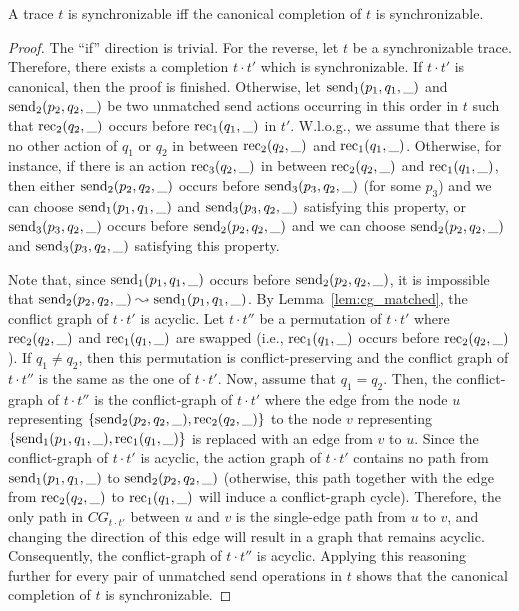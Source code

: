 \begin{lemma}\label{lem:synch_canonical1}
A trace $t$ is synchronizable if{f} the canonical completion of $t$ is synchronizable.
\end{lemma}
\begin{proof}
The ``if'' direction is trivial. For the reverse, let $t$ be a synchronizable trace. Therefore, there exists a completion $t\cdot t'$ which is synchronizable. If $t\cdot t'$ is canonical, then the proof is finished. Otherwise, let $\mathrm{send}_{1}({p_1,q_1,\_})$ and $\mathrm{send}_{2}({p_2,q_2,\_})$ be two unmatched send actions occurring in this order in $t$ such that $\mathrm{rec}_{2}({q_2,\_})$ occurs before $\mathrm{rec}_{1}({q_1,\_})$ in $t'$. 
W.l.o.g., we assume that there is no other action of $q_1$ or $q_2$ in between $\mathrm{rec}_{2}({q_2,\_})$ and $\mathrm{rec}_{1}({q_1,\_})$. Otherwise, for instance, if there is an action $\mathrm{rec}_{3}({q_2,\_})$ in between $\mathrm{rec}_{2}({q_2,\_})$ and $\mathrm{rec}_{1}({q_1,\_})$, then either $\mathrm{send}_{2}({p_2,q_2,\_})$ occurs before $\mathrm{send}_{3}({p_3,q_2,\_})$ (for some $p_3$) and we can choose $\mathrm{send}_{1}({p_1,q_1,\_})$ and $\mathrm{send}_{3}({p_3,q_2,\_})$ satisfying this property, or $\mathrm{send}_{3}({p_3,q_2,\_})$ occurs before $\mathrm{send}_{2}({p_2,q_2,\_})$ and we can choose $\mathrm{send}_{2}({p_2,q_2,\_})$ and $\mathrm{send}_{3}({p_3,q_2,\_})$ satisfying this property.

Note that, since $\mathrm{send}_{1}({p_1,q_1,\_})$ occurs before $\mathrm{send}_{2}({p_2,q_2,\_})$, it is impossible that $\mathrm{send}_{2}({p_2,q_2,\_}) \leadsto \mathrm{send}_{1}({p_1,q_1,\_})$.
By Lemma~\ref{lem:cg_matched}, the conflict graph of $t\cdot t'$ is acyclic. 
Let $t\cdot t''$ be a permutation of $t\cdot t'$ where $\mathrm{rec}_{2}({q_2,\_})$ and $\mathrm{rec}_{1}({q_1,\_})$ are swapped (i.e., $\mathrm{rec}_{1}({q_1,\_})$ occurs before $\mathrm{rec}_{2}({q_2,\_})$). If $q_1\neq q_2$, then this permutation is conflict-preserving and the conflict graph of $t\cdot t''$ is the same as the one of $t\cdot t'$. 
Now, assume that $q_1=q_2$. Then, the conflict-graph of $t\cdot t''$ is the conflict-graph of $t\cdot t'$ where the edge from the node $u$ representing $\{\mathrm{send}_{2}({p_2,q_2,\_}),\mathrm{rec}_{2}({q_2,\_})\}$ to the node $v$ representing $\{\mathrm{send}_{1}({p_1,q_1,\_}), \mathrm{rec}_{1}({q_1,\_})\}$ is replaced with an edge from $v$ to $u$.
Since the conflict-graph of $t\cdot t'$ is acyclic, the action graph of $t\cdot t'$ contains no path from $\mathrm{send}_{1}({p_1,q_1,\_})$ to $\mathrm{send}_{2}({p_2,q_2,\_})$ (otherwise, this path together with the edge from $\mathrm{rec}_{2}({q_2,\_})$ to $\mathrm{rec}_{1}({q_1,\_})$ will induce a conflict-graph cycle). Therefore, the only path in $CG_{t\cdot t'}$ between $u$ and $v$ is the single-edge path from $u$ to $v$, and changing the direction of this edge will result in a graph that remains acyclic. Consequently, the conflict-graph of $t\cdot t''$ is acyclic. Applying this reasoning further for every pair of unmatched send operations in $t$ shows that the canonical completion of $t$ is synchronizable.
\end{proof}

